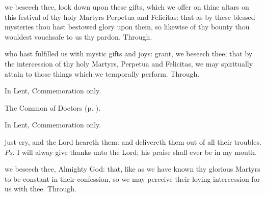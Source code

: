 \secret
{} we beseech thee, look down upon these gifts, which we offer on thine altars on this festival of thy holy Martyrs Perpetua and Felicitas: that as by these blessed mysteries thou hast bestowed glory upon them, so likewise of thy bounty thou wouldest vouchsafe to us thy pardon. Through.

\postcommunion
{} who hast fulfilled us with mystic gifts and joys: grant, we beseech thee; that by the intercession of thy holy Martyrs, Perpetua and Felicitas, we may spiritually attain to those things which we temporally perform. Through.



\begin{rubric}
	In Lent, Commemoration only.
\end{rubric}

\begin{rubric}
	The Common of Doctors (p. \pageref{CommonDoctors}).
\end{rubric}


\clearpage
{}

\begin{rubric}
	In Lent, Commemoration only.
\end{rubric}

\vspace{-0.25\baselineskip}

\introit

\vspace{-0.1\baselineskip}

 just cry, and the Lord heareth them: and delivereth them out of all their troubles. \textit{Ps.} I will alway give thanks unto the Lord; his praise shall ever be in my mouth.

\vspace{-0.25\baselineskip}

\collect

\vspace{-0.1\baselineskip}

 we beseech thee, Almighty God: that, like as we have known thy glorious Martyrs to be constant in their confession, so we may perceive their loving intercession for us with thee. Through.

